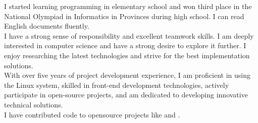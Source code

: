 \documentclass{resume}
\begin{document}
\makeheader


I started learning programming in elementary school and won third place in the National Olympiad in Informatics in Provinces during high school. I can read English documents fluently.\\
I have a strong sense of responsibility and excellent teamwork skills. I am deeply interested in computer science and have a strong desire to explore it further. I enjoy researching the latest technologies and strive for the best implementation solutions.\\
With over five years of project development experience, I am proficient in using the Linux system, skilled in front-end development technologies, actively participate in open-source projects, and am dedicated to developing innovative technical solutions.\\
I have contributed code to opensource projects like  and .

\begin{competences}[10em]
\end{competences}


\end{document}
